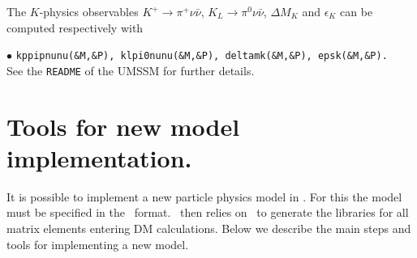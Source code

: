 \documentclass[12pt,a4paper]{article}
\begin{document}
The $K$-physics observables $K^+ \to \pi^+\nu\bar{\nu}$, $K_L \to \pi^0 \nu\bar{\nu}$, $\Delta M_K$ and $\epsilon_K$ can be computed respectively with

\noindent
$\bullet$ {\tt kppipnunu(\&M,\&P), klpi0nunu(\&M,\&P), deltamk(\&M,\&P), epsk(\&M,\&P).}\\ 

\noindent
See the \verb|README| of the UMSSM for further details.


\section{Tools for new model implementation.}


It is possible to  implement a new particle physics  model  in \micro.
For this the model must be specified in the
\calchep\ format. \micro\ then relies on \calchep\ 
to generate the libraries for all matrix elements entering DM calculations. 
Below we describe the main steps and tools for implementing a new model.
\end{document}

